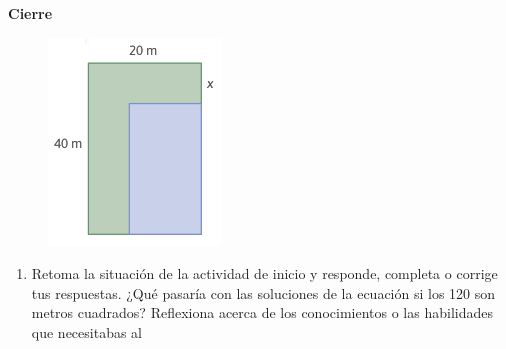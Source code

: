 \documentclass[11pt]{book}
\begin{document}
\begin{boxK}
    \begin{center}\textbf{Cierre}\end{center}

    \begin{minipage}[t]{0.2\textwidth}
        \begin{figure}[H]
            \centering
            \includegraphics[width=\linewidth]{s7l1_cierre.png}
            \label{fig:s7l1_cierre}
        \end{figure}
    \end{minipage}\hfill
    \begin{minipage}[t]{0.8\textwidth}
        \begin{enumerate}
            \item Retoma la situación de la actividad de inicio y responde, completa o corrige
                  tus respuestas. ¿Qué pasaría con las soluciones de la ecuación si los 120 son
                  metros cuadrados?
                  Reflexiona acerca de los conocimientos o las habilidades que necesitabas al

\end{enumerate}
\end{minipage}
\end{boxK}
\end{document}
